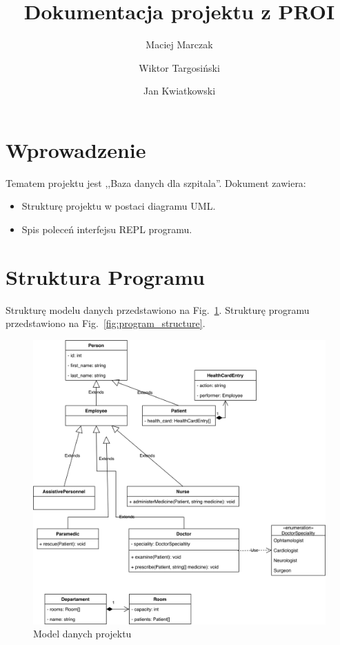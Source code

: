 \documentclass[a4paper, 10pt]{article}
\title{Dokumentacja projektu z PROI}
\author{Maciej Marczak \and Wiktor Targosiński \and Jan Kwiatkowski}
\date{}
\begin{document}
\maketitle

\section{Wprowadzenie}
    Tematem projektu jest ,,Baza danych dla szpitala''.
    Dokument zawiera:
    \begin{itemize}
        \item Strukturę projektu w postaci diagramu UML.
        \item Spis poleceń interfejsu REPL programu.
    \end{itemize}


\section{Struktura Programu}
    Strukturę modelu danych przedstawiono na Fig.~\ref{fig:data_model}.
    Strukturę programu przedstawiono na Fig.~\ref{fig:program_structure}.
    \begin{figure}
        \includegraphics[width=\textwidth]{domain_model.png}
        \caption{Model danych projektu}
        \label{fig:data_model}
    \end{figure}
\end{document}
